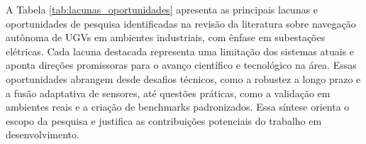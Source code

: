 A Tabela \ref{tab:lacunas_oportunidades} apresenta as principais lacunas e oportunidades de pesquisa identificadas na revisão da literatura sobre navegação autônoma de UGVs em ambientes industriais, com ênfase em subestações elétricas. Cada lacuna destacada representa uma limitação dos sistemas atuais e aponta direções promissoras para o avanço científico e tecnológico na área. Essas oportunidades abrangem desde desafios técnicos, como a robustez a longo prazo e a fusão adaptativa de sensores, até questões práticas, como a validação em ambientes reais e a criação de benchmarks padronizados. Essa síntese orienta o escopo da pesquisa e justifica as contribuições potenciais do trabalho em desenvolvimento.